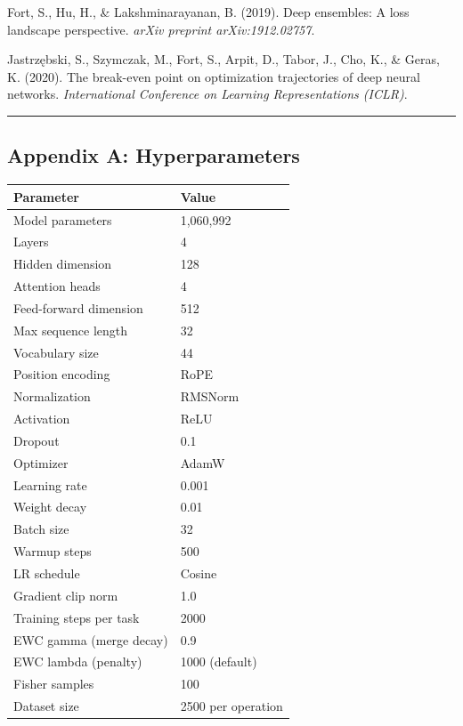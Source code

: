 \documentclass[
]{article}
\begin{document}
Fort, S., Hu, H., \& Lakshminarayanan, B. (2019). Deep ensembles: A loss
landscape perspective. \emph{arXiv preprint arXiv:1912.02757}.

Jastrzębski, S., Szymczak, M., Fort, S., Arpit, D., Tabor, J., Cho, K.,
\& Geras, K. (2020). The break-even point on optimization trajectories
of deep neural networks. \emph{International Conference on Learning
Representations (ICLR)}.

\begin{center}\rule{0.5\linewidth}{0.5pt}\end{center}

\subsection{Appendix A:
Hyperparameters}\label{appendix-a-hyperparameters}

\begin{longtable}[]{@{}ll@{}}
\toprule\noalign{}
Parameter & Value \\
\midrule\noalign{}
\endhead
\bottomrule\noalign{}
\endlastfoot
Model parameters & 1,060,992 \\
Layers & 4 \\
Hidden dimension & 128 \\
Attention heads & 4 \\
Feed-forward dimension & 512 \\
Max sequence length & 32 \\
Vocabulary size & 44 \\
Position encoding & RoPE \\
Normalization & RMSNorm \\
Activation & ReLU \\
Dropout & 0.1 \\
Optimizer & AdamW \\
Learning rate & 0.001 \\
Weight decay & 0.01 \\
Batch size & 32 \\
Warmup steps & 500 \\
LR schedule & Cosine \\
Gradient clip norm & 1.0 \\
Training steps per task & 2000 \\
EWC gamma (merge decay) & 0.9 \\
EWC lambda (penalty) & 1000 (default) \\
Fisher samples & 100 \\
Dataset size & 2500 per operation \\
\end{longtable}
\end{document}
